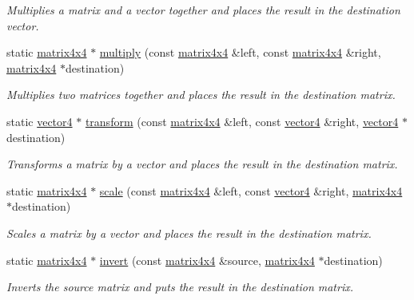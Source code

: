 \begin{DoxyCompactItemize}
\begin{DoxyCompactList}\small\item\em Multiplies a matrix and a vector together and places the result in the destination vector. \end{DoxyCompactList}\item 
static \hyperlink{classflounder_1_1matrix4x4}{matrix4x4} $\ast$ \hyperlink{classflounder_1_1matrix4x4_a25262af6f1e187bb79d702f751d23b06}{multiply} (const \hyperlink{classflounder_1_1matrix4x4}{matrix4x4} \&left, const \hyperlink{classflounder_1_1matrix4x4}{matrix4x4} \&right, \hyperlink{classflounder_1_1matrix4x4}{matrix4x4} $\ast$destination)
\begin{DoxyCompactList}\small\item\em Multiplies two matrices together and places the result in the destination matrix. \end{DoxyCompactList}\item 
static \hyperlink{classflounder_1_1vector4}{vector4} $\ast$ \hyperlink{classflounder_1_1matrix4x4_ae377db4fe0e59fd748462fdc2f6a8939}{transform} (const \hyperlink{classflounder_1_1matrix4x4}{matrix4x4} \&left, const \hyperlink{classflounder_1_1vector4}{vector4} \&right, \hyperlink{classflounder_1_1vector4}{vector4} $\ast$destination)
\begin{DoxyCompactList}\small\item\em Transforms a matrix by a vector and places the result in the destination matrix. \end{DoxyCompactList}\item 
static \hyperlink{classflounder_1_1matrix4x4}{matrix4x4} $\ast$ \hyperlink{classflounder_1_1matrix4x4_a5ac6ac7707c5e5c01654303b5b13c3ba}{scale} (const \hyperlink{classflounder_1_1matrix4x4}{matrix4x4} \&left, const \hyperlink{classflounder_1_1vector4}{vector4} \&right, \hyperlink{classflounder_1_1matrix4x4}{matrix4x4} $\ast$destination)
\begin{DoxyCompactList}\small\item\em Scales a matrix by a vector and places the result in the destination matrix. \end{DoxyCompactList}\item 
static \hyperlink{classflounder_1_1matrix4x4}{matrix4x4} $\ast$ \hyperlink{classflounder_1_1matrix4x4_a37ca0be43e7f10e09c7c7b4b7e161221}{invert} (const \hyperlink{classflounder_1_1matrix4x4}{matrix4x4} \&source, \hyperlink{classflounder_1_1matrix4x4}{matrix4x4} $\ast$destination)
\begin{DoxyCompactList}\small\item\em Inverts the source matrix and puts the result in the destination matrix. \end{DoxyCompactList}\item 

\end{DoxyCompactItemize}
